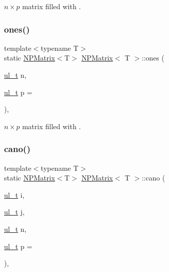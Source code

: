 $ n \times p $ matrix filled with {}. 

\mbox{\label{class_n_p_matrix_a6509ca1d29b8b87f2d437883f48a40c9}} 
\subsubsection{\texorpdfstring{ones()}{ones()}}
{\footnotesize\ttfamily template$<$typename T$>$ \\
static \mbox{\hyperlink{class_n_p_matrix}{N\+P\+Matrix}}$<$T$>$ \mbox{\hyperlink{class_n_p_matrix}{N\+P\+Matrix}}$<$ T $>$\+::ones (\begin{DoxyParamCaption}\item[{\mbox{\hyperlink{group___n_algebra_ga1b140a2034db3f5dfe18a987745df43a}{ul\+\_\+t}}}]{n,  }\item[{\mbox{\hyperlink{group___n_algebra_ga1b140a2034db3f5dfe18a987745df43a}{ul\+\_\+t}}}]{p = {} }\end{DoxyParamCaption})\hspace{0.3cm}{\ttfamily [inline]}, {\ttfamily [static]}}



$ n \times p $ matrix filled with {}. 

\mbox{\label{class_n_p_matrix_ab0b53ef59fa95ac9a0a2a3214c4845e5}} 
\subsubsection{\texorpdfstring{cano()}{cano()}}
{\footnotesize\ttfamily template$<$typename T$>$ \\
static \mbox{\hyperlink{class_n_p_matrix}{N\+P\+Matrix}}$<$T$>$ \mbox{\hyperlink{class_n_p_matrix}{N\+P\+Matrix}}$<$ T $>$\+::cano (\begin{DoxyParamCaption}\item[{\mbox{\hyperlink{group___n_algebra_ga1b140a2034db3f5dfe18a987745df43a}{ul\+\_\+t}}}]{i,  }\item[{\mbox{\hyperlink{group___n_algebra_ga1b140a2034db3f5dfe18a987745df43a}{ul\+\_\+t}}}]{j,  }\item[{\mbox{\hyperlink{group___n_algebra_ga1b140a2034db3f5dfe18a987745df43a}{ul\+\_\+t}}}]{n,  }\item[{\mbox{\hyperlink{group___n_algebra_ga1b140a2034db3f5dfe18a987745df43a}{ul\+\_\+t}}}]{p = {} }\end{DoxyParamCaption})\hspace{0.3cm}{\ttfamily [inline]}, {\ttfamily [static]}}



